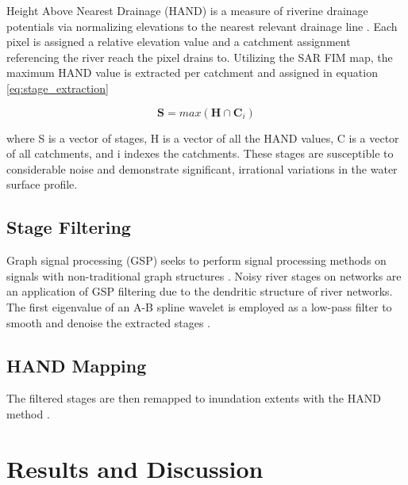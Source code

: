 \documentclass{article}
\begin{document}
Height Above Nearest Drainage (HAND) is a measure of riverine drainage potentials via normalizing elevations to the nearest relevant drainage line \cite{renno2008hand,nobre2011height,nobre2016hand,aristizabal2020cahaba}. 
Each pixel is assigned a relative elevation value and a catchment assignment referencing the river reach the pixel drains to.
Utilizing the SAR FIM map, the maximum HAND value is extracted per catchment and assigned in equation \ref{eq:stage_extraction} 

\begin{equation}
\label{eq:stage_extraction}
\textbf{S} = max(\textbf{H} \cap \textbf{C}_i)
\end{equation}

where S is a vector of stages, H is a vector of all the HAND values, C is a vector of all catchments, and i indexes the catchments.
These stages are susceptible to considerable noise and demonstrate significant, irrational variations in the water surface profile. 

\subsection{Stage Filtering}
\label{ssec:stage_filtering}

Graph signal processing (GSP) seeks to perform signal processing methods on signals with non-traditional graph structures \cite{gavili2017shift,defferrard2017pygsp,ortega2018graph,chen2014signal}. 
Noisy river stages on networks are an application of GSP filtering due to the dendritic structure of river networks.
The first eigenvalue of an A-B spline wavelet is employed as a low-pass filter to smooth and denoise the extracted stages \cite{defferrard2017pygsp}.

\subsection{HAND Mapping}
\label{ssec:hand_mapping}

The filtered stages are then remapped to inundation extents with the HAND method \cite{renno2008hand,nobre2011height,nobre2016hand,aristizabal2020cahaba}.   

\section{Results and Discussion}
\label{sec:results_and_discussion}



\end{document}
